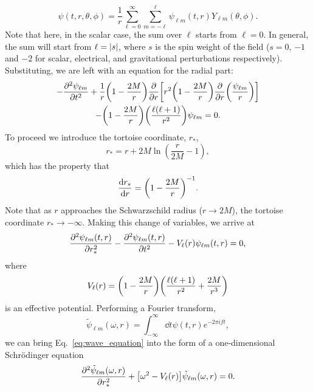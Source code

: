 \begin{equation}
    \psi(t, r, \theta, \phi) = \frac{1}{r} \sum_{\ell = 0}^\infty \sum_{m = -\ell}^\ell \psi_{\ell m}(t, r) Y_{\ell m}(\theta, \phi).
\end{equation}
Note that here, in the scalar case, the sum over $\ell$ starts from $\ell = 0$.
In general, the sum will start from $\ell = \abs{s}$, where $s$ is the spin weight of the field ($s=0$, $-1$ and $-2$ for scalar, electrical, and gravitational perturbations respectively).
Substituting, we are left with an equation for the radial part:
\begin{multline}
    - \pdv[2]{\psi_{\ell m}}{t} + \frac{1}{r} \qty(1 - \frac{2M}{r}) \pdv{r} \qty[r^2 \qty(1 - \frac{2M}{r}) \pdv{r}\qty(\frac{\psi_{\ell m}}{r}) ]\\
    - \qty(1 - \frac{2M}{r}) \qty(\frac{\ell (\ell + 1)}{r^2}) \psi_{\ell m} = 0.
\end{multline}
To proceed we introduce the tortoise coordinate, $r_*$,
\begin{equation}
    r_* = r + 2M \ln(\frac{r}{2M} - 1),
\end{equation}
which has the property that
\begin{equation}
    \dv{r_*}{r} = \qty( 1 - \frac{2M}{r} )^{-1}.
\end{equation}
Note that as $r$ approaches the Schwarzschild radius ($r \rightarrow 2M$), the tortoise coordinate $r_* \rightarrow -\infty$.
Making this change of variables, we arrive at
\begin{equation}\label{eq:wave_equation}
    \pdv[2]{\psi_{\ell m}(t,r)}{r_*} - \pdv[2]{\psi_{\ell m}(t,r)}{t} - V_\ell(r) \psi_{\ell m}(t,r) = 0,
\end{equation}
where
\begin{equation}
    V_\ell(r) = \qty( 1 - \frac{2M}{r} ) \qty( \frac{\ell (\ell + 1)}{r^2} + \frac{2M}{r^3} )
\end{equation}
is an effective potential.
Performing a Fourier transform, 
\begin{equation}\label{ch1:eq:ft}
    \tilde{\psi}_{\ell m}(\omega,r) = \int_{-\infty}^\infty \dd{t} \psi(t,r) e^{-2\pi i f t},
\end{equation}
we can bring Eq.~\ref{eq:wave_equation} into the form of a one-dimensional Schr\"{o}dinger equation
\begin{equation}\label{eq:fd_wave_equation}
    \pdv[2]{\tilde{\psi}_{\ell m}(\omega,r)}{r_*} + \qty[ \omega^2 - V_\ell(r)] \tilde{\psi}_{\ell m}(\omega,r) = 0.
\end{equation}
